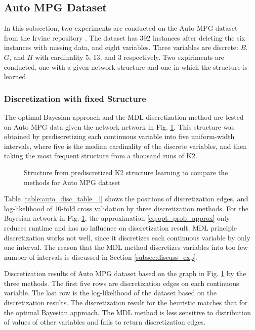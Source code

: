 \subsection{Auto MPG Dataset}
\label{subsec:auto}

In this subsection, two experiments are conducted on the Auto MPG dataset from the Irvine repository \citep{Lichman_2013}. The dataset has \num{392} instances after deleting the six instances with missing data, and eight variables. Three variables are discrete: $B$, $G$, and $H$ with cardinality \num{5}, \num{13}, and \num{3} respectively. Two expiriments are conducted, one with a given network structure and one in which the structure is learned.

\subsubsection{Discretization with fixed Structure}
\label{subsubsec:auto_exp1}

The optimal Bayesian approach and the MDL discretization method are tested on Auto MPG data given the network network in Fig. \ref{fig:auto_graph_1}. This structure was obtained by prediscretizing each continuous variable into five uniform-width intervals, where five is the median cardinality of the discrete variables, and then taking the most frequent structure from a thousand runs of K2. 

\begin{figure}[ht]
  \centering
   
   \caption{Structure from prediscretized K2 structure learning to compare the methods for Auto MPG dataset}
  \label{fig:auto_graph_1}
\end{figure}

Table \ref{table:auto_disc_table_1} shows the positions of discretization edges, and log-likelihood of 10-fold cross validation by three discretization methods. For the Bayesian network in Fig. \ref{fig:auto_graph_1}, the approximation \ref{eq:opt_prob_approx} only reduces runtime and has no influence on discretization result. MDL principle discretization works not well, since it discretizes each continuous variable by only one interval. The reason that the MDL method discretizes variables into too few number of intervals is discussed in Section \ref{subsec:discuss_exp}.

\begin{table}[h]
  \centering
  \caption{Discretization results of Auto MPG dataset based on the graph in Fig. \ref{fig:auto_graph_1} by the three methods. The first five rows are discretization edges on each continuous variable. The last row is the log-likelihood of the dataset based on the discretization results. The discretization result for the heuristic matches that for the optimal Bayesian approach. The MDL method is less sensitive to distribution of values of other variables and fails to return discretization edges.}
  
  \label{table:auto_disc_table_1}
\end{table}

